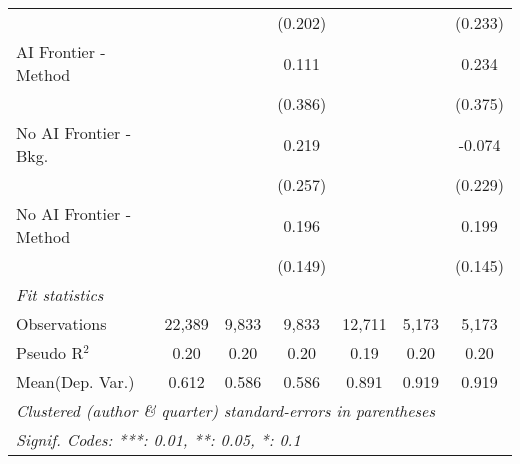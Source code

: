 \begin{tabular}{lcccccc}
                           &               &               & (0.202)      &               &               & (0.233)\\   
   AI Frontier - Method    &               &               & 0.111        &               &               & 0.234\\   
                           &               &               & (0.386)      &               &               & (0.375)\\   
   No AI Frontier - Bkg.   &               &               & 0.219        &               &               & -0.074\\   
                           &               &               & (0.257)      &               &               & (0.229)\\   
   No AI Frontier - Method &               &               & 0.196        &               &               & 0.199\\   
                           &               &               & (0.149)      &               &               & (0.145)\\   
   \midrule
   \emph{Fit statistics}\\
   Observations            & 22,389        & 9,833         & 9,833        & 12,711        & 5,173         & 5,173\\  
   Pseudo R$^2$            & 0.20          & 0.20          & 0.20         & 0.19          & 0.20          & 0.20\\  
Mean(Dep. Var.) & 0.612 & 0.586 & 0.586 & 0.891 & 0.919 & 0.919 \\
   \midrule \midrule
   \multicolumn{7}{l}{\emph{Clustered (author \& quarter) standard-errors in parentheses}}\\
   \multicolumn{7}{l}{\emph{Signif. Codes: ***: 0.01, **: 0.05, *: 0.1}}\\
\end{tabular}
\par\endgroup
